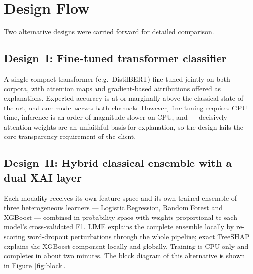 \documentclass[12pt,a4paper]{report}
\begin{document}
\section{Design Flow}

Two alternative designs were carried forward for detailed comparison.

\subsection{Design~I: Fine-tuned transformer classifier}

A single compact transformer (e.g.\ DistilBERT) fine-tuned jointly on both
corpora, with attention maps and gradient-based attributions offered as
explanations. Expected accuracy is at or marginally above the classical
state of the art, and one model serves both channels. However, fine-tuning
requires GPU time, inference is an order of magnitude slower on CPU, and ---
decisively --- attention weights are an unfaithful basis for explanation, so
the design fails the core transparency requirement of the client.

\subsection{Design~II: Hybrid classical ensemble with a dual XAI layer}

Each modality receives its own feature space and its own trained ensemble of
three heterogeneous learners --- Logistic Regression, Random Forest and
XGBoost --- combined in probability space with weights proportional to each
model's cross-validated F1. LIME explains the complete ensemble locally by
re-scoring word-dropout perturbations through the whole pipeline; exact
TreeSHAP explains the XGBoost component locally and globally. Training is
CPU-only and completes in about two minutes. The block diagram of this
alternative is shown in Figure~\ref{fig:block}.
\end{document}
